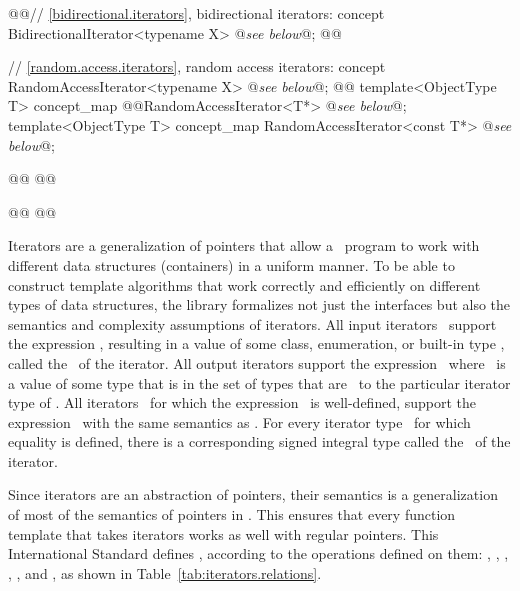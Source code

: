 \documentclass[american,twoside]{book}
\begin{document}
\begin{paras}
\begin{codeblock}
{  @\textcolor{addclr}{}@// \ref{bidirectional.iterators}, bidirectional iterators:
  concept BidirectionalIterator<typename X> @\textit{see below}@;
  @@

  // \ref{random.access.iterators}, random access iterators:
  concept RandomAccessIterator<typename X> @\textit{see below}@;
  @@
  template<ObjectType T> concept_map @@RandomAccessIterator<T*> @\textit{see below}@;
  template<ObjectType T> concept_map RandomAccessIterator<const T*> @\textit{see below}@;

  @@
  @@

  @@
  @@
}
\end{codeblock}
\color{black}

\pnum
{}%
Iterators are a generalization of pointers that allow a \Cpp\ program to work with different data structures
(containers) in a uniform manner.
To be able to construct template algorithms that work correctly and
efficiently on different types of data structures, the library formalizes not just the interfaces but also the
semantics and complexity assumptions of iterators.
All input iterators
\
support the expression
,
resulting in a value of some class, enumeration, or built-in type
\tcode{T},
called the
\ 
of the iterator.
All output iterators support the expression
\
where
\tcode{o}\
is a value of some type that is in the set of types that are
\
to the particular iterator type of
.
All iterators
\tcode{i}\
for which the expression
\
is well-defined, support the expression
\tcode{i->m}\
with the same semantics as
\tcode{(*i).m}.
For every iterator type
\tcode{X}\
for which
equality is defined, there is a corresponding signed integral type called the
\ 
of the iterator.

\pnum
Since iterators are an abstraction of pointers, their semantics is
a generalization of most of the semantics of pointers in \Cpp.
This ensures that every
function template
that takes iterators
works as well with regular pointers.
This International Standard defines
, according to the operations
defined on them:
,
\techterm{output iterators},
\techterm{forward iterators}, 
, 
, and
,
as shown in Table~\ref{tab:iterators.relations}.


\end{paras}
\end{document}

